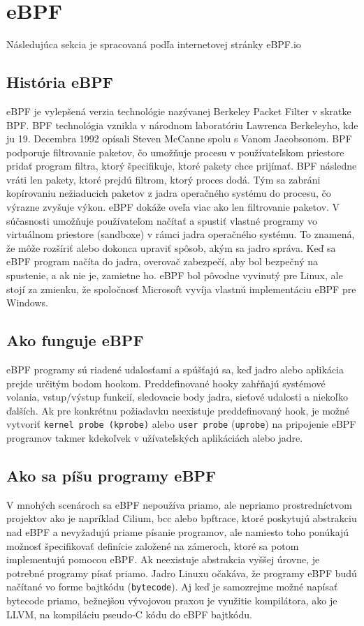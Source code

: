 \section{eBPF}
Následujúca sekcia je spracovaná podľa internetovej stránky eBPF.io~\cite{eBPF}

\subsection{História eBPF}
eBPF je vylepšená verzia technológie nazývanej Berkeley Packet Filter v skratke BPF. BPF technológia vznikla v národnom laboratóriu Lawrenca Berkeleyho, kde ju 19. Decembra 1992 opísali Steven McCanne spolu s Vanom Jacobsonom. BPF podporuje filtrovanie paketov, čo umožňuje procesu v používateľskom priestore pridať program filtra, ktorý špecifikuje, ktoré pakety chce prijímať. BPF následne vráti len pakety, ktoré prejdú filtrom, ktorý proces dodá. Tým sa zabráni kopírovaniu nežiaducich paketov z jadra operačného systému do procesu, čo výrazne zvyšuje výkon.
eBPF dokáže oveľa viac ako len filtrovanie paketov. V súčasnosti umožňuje používateľom načítať a spustiť vlastné programy vo virtuálnom priestore (sandboxe) v rámci jadra operačného systému. To znamená, že môže rozšíriť alebo dokonca upraviť spôsob, akým sa jadro správa. Keď sa eBPF program načíta do jadra, overovač zabezpečí, aby bol bezpečný na spustenie, a ak nie je, zamietne ho. eBPF bol pôvodne vyvinutý pre Linux, ale stojí za zmienku, že spoločnosť Microsoft vyvíja vlastnú implementáciu eBPF pre Windows.

\subsection{Ako funguje eBPF} 
eBPF programy sú riadené udalosťami a spúšťajú sa, keď jadro alebo aplikácia prejde určitým bodom hookom. Preddefinované hooky zahŕňajú systémové volania, vstup/výstup funkcií, sledovacie body jadra, sieťové udalosti a niekoľko ďalších.
Ak pre konkrétnu požiadavku neexistuje preddefinovaný hook, je možné vytvoriť \texttt{kernel probe (\texttt{kprobe})} alebo \texttt{user probe} (\texttt{uprobe}) na pripojenie eBPF programov takmer kdekoľvek v užívateľských aplikáciách alebo jadre.

\subsection{Ako sa píšu programy eBPF}
V mnohých scenároch sa eBPF nepoužíva priamo, ale nepriamo prostredníctvom projektov ako je napríklad Cilium, bcc alebo bpftrace, ktoré poskytujú abstrakciu nad eBPF a nevyžadujú priame písanie programov, ale namiesto toho ponúkajú možnosť špecifikovať definície založené na zámeroch, ktoré sa potom implementujú pomocou eBPF.
Ak neexistuje abstrakcia vyššej úrovne, je potrebné programy písať priamo. Jadro Linuxu očakáva, že programy eBPF budú načítané vo forme bajtkódu (\texttt{bytecode}). Aj keď je samozrejme možné napísať bytecode priamo, bežnejšou vývojovou praxou je využitie kompilátora, ako je LLVM, na kompiláciu pseudo-C kódu do eBPF bajtkódu.

